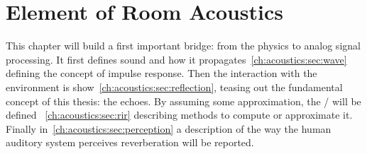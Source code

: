 \chapter{Element of Room Acoustics}\label{chap:acoustics}
\vspace{-2.5em}
This chapter will build a first important bridge: from the physics to analog signal processing.
It first defines sound and how it propagates~\cref{ch:acoustics:sec:wave} defining the concept of impulse response.
Then the interaction with the environment is show~\cref{ch:acoustics:sec:reflection}, teasing out the fundamental concept of this thesis: the echoes.
By assuming some approximation, the \RIRdef/ will be defined ~\cref{ch:acoustics:sec:rir} describing methods to compute or approximate it.
Finally in~\cref{ch:acoustics:sec:perception} a description of the way the human auditory system perceives reverberation will be reported.


